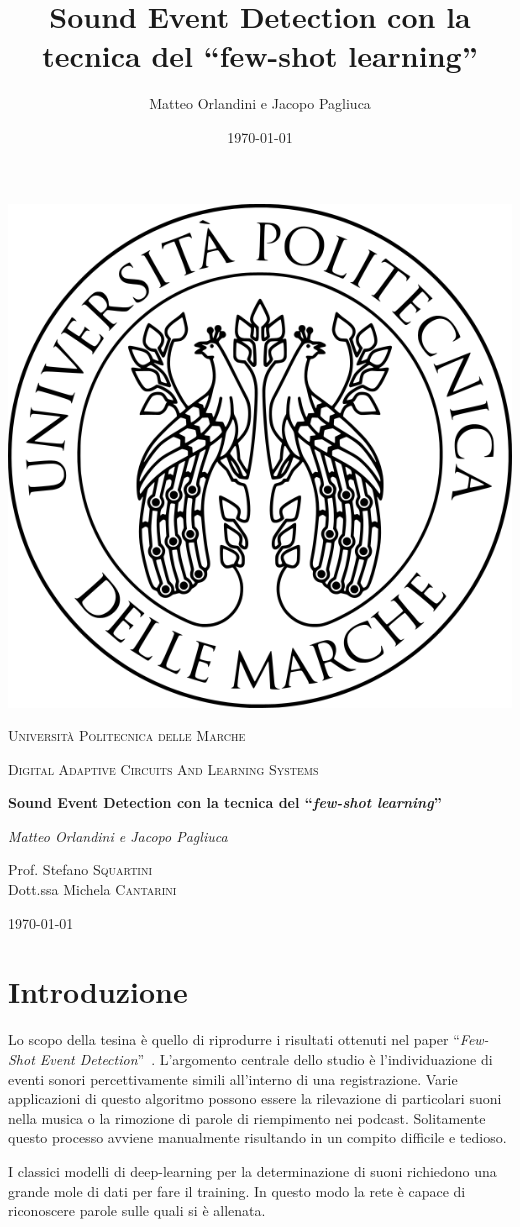 \documentclass[12pt,a4paper,titlepage]{article}
\title{Sound Event Detection con la tecnica del ``few-shot learning''}
\author{Matteo Orlandini e Jacopo Pagliuca}
\date{\today}
\begin{document}
\begin{titlepage}
	
	\centering
	\includegraphics[width=.2\textwidth]{Immagini/univpmlogo}\par\vspace{1cm}
	{\scshape\LARGE Università Politecnica delle Marche\par}
	\vspace{1cm}
	{\scshape\Large Digital Adaptive Circuits And Learning Systems\par}
	\vspace{1.5cm}
	{\huge\bfseries Sound Event Detection con la tecnica del  ``\emph{few-shot learning}''  \par}
	\vspace{2cm}
	{\Large\itshape Matteo Orlandini e Jacopo Pagliuca\par}
	\vfill
	Prof. Stefano \textsc{Squartini}\\
	Dott.ssa Michela \textsc{Cantarini}
	
	\vfill
	
	{\large \today\par}
\end{titlepage}

\thispagestyle{empty}
\tableofcontents
\clearpage

\setcounter{page}{1}

\section{Introduzione}
\label{section:Introduzione}
Lo scopo della tesina è quello di riprodurre i risultati ottenuti nel paper ``\textit{Few-Shot Event Detection}''~\cite{Salamon:Few-Shot}.
L'argomento centrale dello studio è l'individuazione di eventi sonori percettivamente simili all'interno di una registrazione.
Varie applicazioni di questo algoritmo possono essere la rilevazione di particolari suoni nella musica o la rimozione di parole di riempimento nei podcast.
Solitamente questo processo avviene manualmente risultando in un compito difficile e tedioso.

I classici modelli di deep-learning per la determinazione di suoni richiedono una grande mole di dati per fare il training. In questo modo la rete è capace di riconoscere parole sulle quali si è allenata.
\end{document}
